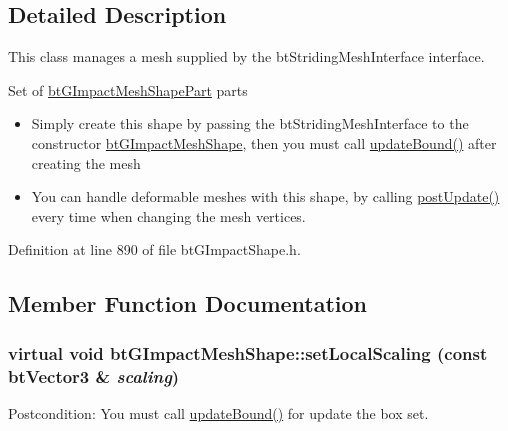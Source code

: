 \subsection{Detailed Description}
This class manages a mesh supplied by the btStridingMeshInterface interface. 

Set of \hyperlink{classbt_g_impact_mesh_shape_part}{btGImpactMeshShapePart} parts\begin{itemize}
\item Simply create this shape by passing the btStridingMeshInterface to the constructor \hyperlink{classbt_g_impact_mesh_shape}{btGImpactMeshShape}, then you must call \hyperlink{classbt_g_impact_shape_interface_cb26c2d7a2aecabd06b996b72b848492}{updateBound()} after creating the mesh\end{itemize}


\begin{itemize}
\item You can handle deformable meshes with this shape, by calling \hyperlink{classbt_g_impact_mesh_shape_fbf7ae3408bc0ab975c46ed65820a4b2}{postUpdate()} every time when changing the mesh vertices. \end{itemize}


Definition at line 890 of file btGImpactShape.h.

\subsection{Member Function Documentation}
\hypertarget{classbt_g_impact_mesh_shape_ed8d5e4b2e75538109909d44b244bc35}{
\subsubsection[setLocalScaling]{\setlength{\rightskip}{0pt plus 5cm}virtual void btGImpactMeshShape::setLocalScaling (const btVector3 \& {\em scaling})}}
\label{classbt_g_impact_mesh_shape_ed8d5e4b2e75538109909d44b244bc35}


\begin{Desc}
\item[Postcondition:]You must call \hyperlink{classbt_g_impact_shape_interface_cb26c2d7a2aecabd06b996b72b848492}{updateBound()} for update the box set. \end{Desc}


